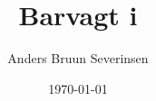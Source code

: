 

\title{Barvagt i \\ \fredagscafeen}
\date{\today}
\author{Anders Bruun Severinsen}



\maketitle

\tableofcontents

\vspace{0.4cm}











\printindex


